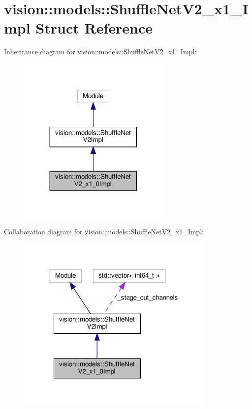 \hypertarget{structvision_1_1models_1_1ShuffleNetV2__x1__0Impl}{}\section{vision\+:\+:models\+:\+:Shuffle\+Net\+V2\+\_\+x1\+\_\+Impl Struct Reference}
\label{structvision_1_1models_1_1ShuffleNetV2__x1__0Impl}


Inheritance diagram for vision\+:\+:models\+:\+:Shuffle\+Net\+V2\+\_\+x1\+\_\+Impl\+:
\nopagebreak
\begin{figure}[H]
\begin{center}
\leavevmode
\includegraphics[width=212pt]{structvision_1_1models_1_1ShuffleNetV2__x1__0Impl__inherit__graph}
\end{center}
\end{figure}


Collaboration diagram for vision\+:\+:models\+:\+:Shuffle\+Net\+V2\+\_\+x1\+\_\+Impl\+:
\nopagebreak
\begin{figure}[H]
\begin{center}
\leavevmode
\includegraphics[width=276pt]{structvision_1_1models_1_1ShuffleNetV2__x1__0Impl__coll__graph}
\end{center}
\end{figure}
